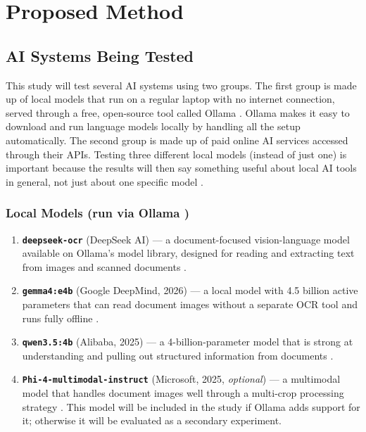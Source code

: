\section{Proposed Method}
\label{sec:method}

\subsection{AI Systems Being Tested}

This study will test several AI systems using two groups. The first group is made up of local models that run on a regular laptop with no internet connection, served through a free, open-source tool called Ollama \cite{ollama_2024}. Ollama makes it easy to download and run language models locally by handling all the setup automatically. The second group is made up of paid online AI services accessed through their APIs. Testing three different local models (instead of just one) is important because the results will then say something useful about local AI tools in general, not just about one specific model \cite{gemma4_phi4_qwen3_2026}.

\subsubsection*{Local Models (run via Ollama \cite{ollama_2024})}

\begin{enumerate}
    \item \textbf{\texttt{deepseek-ocr}} (DeepSeek AI) --- a document-focused vision-language model available on Ollama's model library, designed for reading and extracting text from images and scanned documents \cite{deepseek_ocr_2024}.
    \item \textbf{\texttt{gemma4:e4b}} (Google DeepMind, 2026) --- a local model with 4.5 billion active parameters that can read document images without a separate OCR tool and runs fully offline \cite{gemma4_2026}.
    \item \textbf{\texttt{qwen3.5:4b}} (Alibaba, 2025) --- a 4-billion-parameter model that is strong at understanding and pulling out structured information from documents \cite{qwen3_2025}.
    \item \textbf{\texttt{Phi-4-multimodal-instruct}} (Microsoft, 2025, \textit{optional}) --- a multimodal model that handles document images well through a multi-crop processing strategy \cite{phi4mini_2025}. This model will be included in the study if Ollama adds support for it; otherwise it will be evaluated as a secondary experiment.
\end{enumerate}

